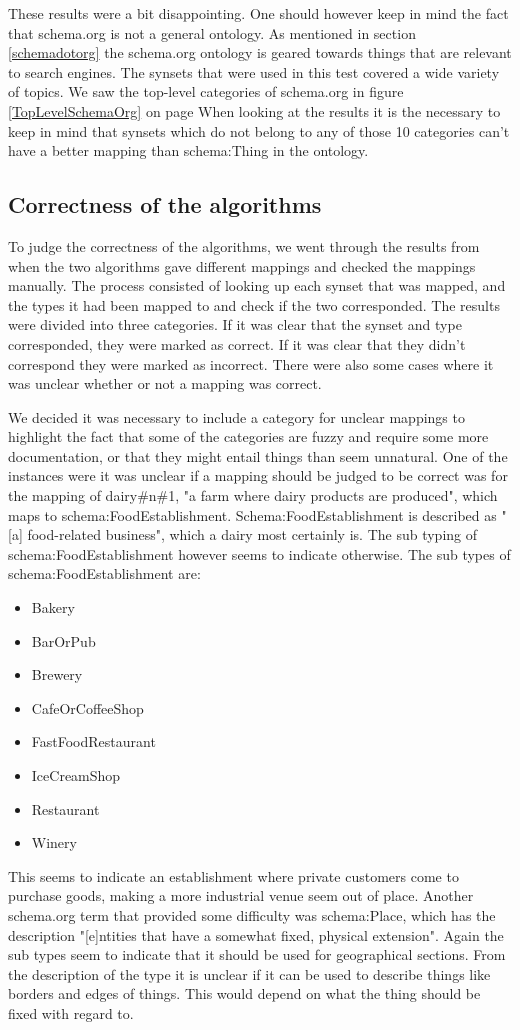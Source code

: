 These results were a bit disappointing.
One should however keep in mind the fact that schema.org is not a general ontology.
As mentioned in section \ref{schemadotorg} the schema.org ontology is geared towards things that are relevant to search engines.
The synsets that were used in this test covered a wide variety of topics.
We saw the top-level categories of schema.org in figure \ref {TopLevelSchemaOrg} on page \pageref{TopLevelSchemaOrg}
When looking at the results it is the necessary to keep in mind that
synsets which do not belong to any of those 10 categories can't have a better mapping than schema:Thing in the ontology.

\subsection{Correctness of the algorithms}
To judge the correctness of the algorithms,
we went through the results from when the two algorithms gave different mappings and checked the mappings manually.
The process consisted of looking up each synset that was mapped,
and the types it had been mapped to and check if the two corresponded.
The results were divided into three categories.
If it was clear that the synset and type corresponded, they were marked as correct.
If it was clear that they didn't correspond they were marked as incorrect.
There were also some cases where it was unclear whether or not a mapping was correct.

We decided it was necessary to include a category for unclear mappings to highlight the fact that some of the categories
are fuzzy and require some more documentation,
or that they might entail things than seem unnatural.
One of the instances were it was unclear if a mapping should be judged to be correct was for the mapping of dairy\#n\#1,
"a farm where dairy products are produced", which maps to schema:FoodEstablishment.
Schema:FoodEstablishment is described as "[a] food-related business", which a dairy most certainly is.
The sub typing of schema:FoodEstablishment however seems to indicate otherwise.
The sub types of schema:FoodEstablishment are:
\begin{itemize}
	\item Bakery
	\item BarOrPub
	\item Brewery
	\item CafeOrCoffeeShop
	\item FastFoodRestaurant
	\item IceCreamShop
	\item Restaurant
	\item Winery
\end{itemize}
This seems to indicate an establishment where private customers come to purchase goods,
making a more industrial venue seem out of place.
Another schema.org term that provided some difficulty was schema:Place,
which has the description "[e]ntities that have a somewhat fixed, physical extension".
Again the sub types seem to indicate that it should be used for geographical sections.
From the description of the type it is unclear if it can be used to describe things like borders and edges of things.
This would depend on what the thing should be fixed with regard to.

